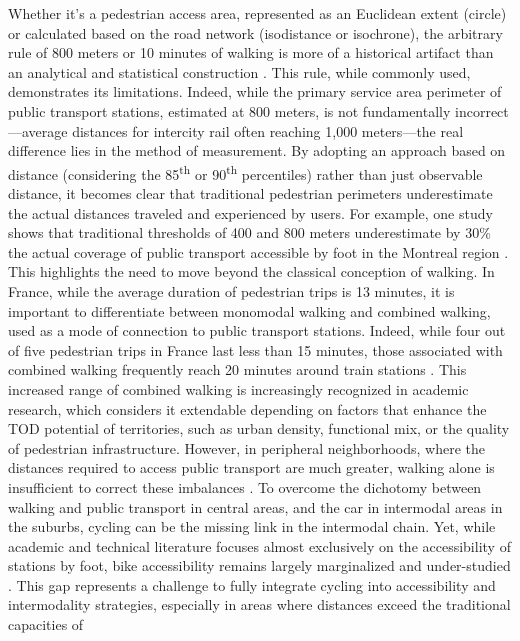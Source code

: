 \begin{refsegment}
Whether it's a pedestrian access area, represented as an Euclidean extent (circle) or calculated based on the road network (isodistance or isochrone), the arbitrary rule of 800 meters or 10 minutes of walking is more of a historical artifact than an analytical and statistical construction \textcolor{blue}{\autocite[102]{guerra_half-mile_2012}}. This rule, while commonly used, demonstrates its limitations. Indeed, while the primary service area perimeter of public transport stations, estimated at 800 meters, is not fundamentally incorrect—average distances for intercity rail often reaching 1,000 meters—the real difference lies in the method of measurement. By adopting an approach based on  distance (considering the 85\textsuperscript{th} or 90\textsuperscript{th} percentiles) rather than just observable distance, it becomes clear that traditional pedestrian perimeters underestimate the actual distances traveled and experienced by users. For example, one study shows that traditional thresholds of 400 and 800 meters underestimate by 30\% the actual coverage of public transport accessible by foot in the Montreal region \textcolor{blue}{\autocite[20]{el-geneidy_new_2014}}. This highlights the need to move beyond the classical conception of walking. In France, while the average duration of pedestrian trips is 13 minutes, it is important to differentiate between monomodal walking and combined walking, used as a mode of connection to public transport stations. Indeed, while four out of five pedestrian trips in France last less than 15 minutes, those associated with combined walking frequently reach 20 minutes around train stations \textcolor{blue}{\autocite[23]{solere_mobilite_2010}}. This increased range of combined walking is increasingly recognized in academic research, which considers it extendable depending on factors that enhance the \acrshort{TOD} potential of territories, such as urban density, functional mix, or the quality of pedestrian infrastructure. However, in peripheral neighborhoods, where the distances required to access public transport are much greater, walking alone is insufficient to correct these imbalances \textcolor{blue}{\autocite[85]{cervero_bike-and-ride_2013}}. To overcome the dichotomy between walking and public transport in central areas, and the car in intermodal areas in the suburbs, cycling can be the missing link in the intermodal chain. Yet, while academic and technical literature focuses almost exclusively on the accessibility of stations by foot, bike accessibility remains largely marginalized and under-studied \textcolor{blue}{\autocite[283]{martens_bicycle_2004}}. This gap represents a challenge to fully integrate cycling into accessibility and intermodality strategies, especially in areas where distances exceed the traditional capacities of 
\end{refsegment}

